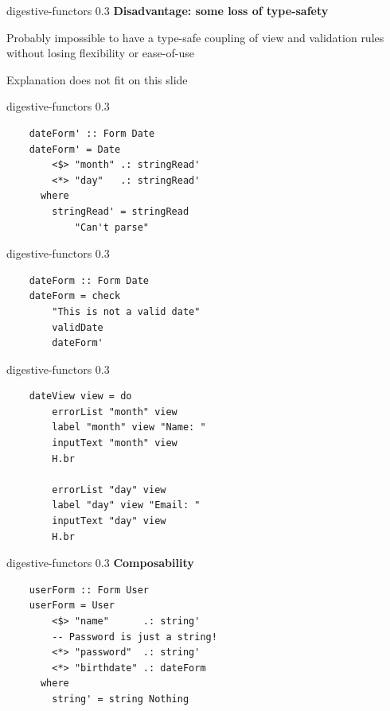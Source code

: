 \documentclass[20pt]{beamer}
\newcommand{\vspaced}{
    \vspace{5mm}
}
\begin{document}
\begin{frame}{digestive-functors 0.3}
    \textbf{Disadvantage: some loss of type-safety} \\
    \vspaced
    Probably impossible to have a type-safe coupling of view and validation
    rules without losing flexibility or ease-of-use \\
    \vspaced
    Explanation does not fit on this slide \\
\end{frame}

\begin{frame}[fragile]{digestive-functors 0.3}
    \begin{lstlisting}
    dateForm' :: Form Date
    dateForm' = Date
        <$> "month" .: stringRead'
        <*> "day"   .: stringRead'
      where
        stringRead' = stringRead
            "Can't parse"
    \end{lstlisting}
\end{frame}

\begin{frame}[fragile]{digestive-functors 0.3}
    \begin{lstlisting}
    dateForm :: Form Date
    dateForm = check
        "This is not a valid date"
        validDate
        dateForm'
    \end{lstlisting}
\end{frame}

\begin{frame}[fragile]{digestive-functors 0.3}
    \begin{lstlisting}
    dateView view = do
        errorList "month" view
        label "month" view "Name: "
        inputText "month" view
        H.br

        errorList "day" view
        label "day" view "Email: "
        inputText "day" view
        H.br
    \end{lstlisting}
\end{frame}

\begin{frame}[fragile]{digestive-functors 0.3}
    \textbf{Composability} \\
    \vspaced
    \begin{lstlisting}
    userForm :: Form User
    userForm = User
        <$> "name"      .: string'
        -- Password is just a string!
        <*> "password"  .: string'
        <*> "birthdate" .: dateForm
      where
        string' = string Nothing
    \end{lstlisting}
\end{frame}
\end{document}
